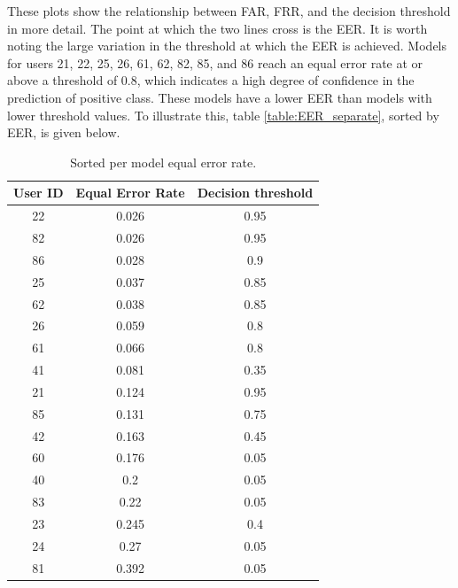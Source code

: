 These plots show the relationship between FAR, FRR, and the decision threshold in more detail. The point at which the two lines cross is the EER. It is worth noting the large variation in the threshold at which the EER is achieved. Models for users 21, 22, 25, 26, 61, 62, 82, 85, and 86 reach an equal error rate at or above a threshold of 0.8, which indicates a high degree of confidence in the prediction of positive class. These models have a lower EER than models with lower threshold values. To illustrate this, table \ref{table:EER_separate}, sorted by EER, is given below.

\begin{center}
	\begin{table}[H]
		\begin{center}
			\begin{tabular}{ |c|c|c| } 
				\hline
				User ID & Equal Error Rate & Decision threshold \\
				\hline
				22 & 0.026 & 0.95 \\
				\hline
				82 & 0.026 & 0.95 \\
				\hline
				86 & 0.028 & 0.9 \\
				\hline
				25 & 0.037 & 0.85 \\
				\hline
				62 & 0.038 & 0.85 \\
				\hline
				26 & 0.059 & 0.8 \\
				\hline
				61 & 0.066 & 0.8 \\
				\hline
				41 & 0.081 & 0.35 \\
				\hline
				21 & 0.124 & 0.95 \\
				\hline
				85 & 0.131 & 0.75 \\
				\hline
				42 & 0.163 & 0.45 \\
				\hline
				60 & 0.176 & 0.05 \\
				\hline
				40 & 0.2 & 0.05 \\
				\hline
				83 & 0.22 & 0.05 \\
				\hline
				23 & 0.245 & 0.4 \\
				\hline
				24 & 0.27 & 0.05 \\
				\hline
				81 & 0.392 & 0.05 \\
				\hline
			\end{tabular}
		\end{center}
		\caption{Sorted per model equal error rate.}
		\label{table:EER_separate_sorted}
	\end{table}
\end{center}

